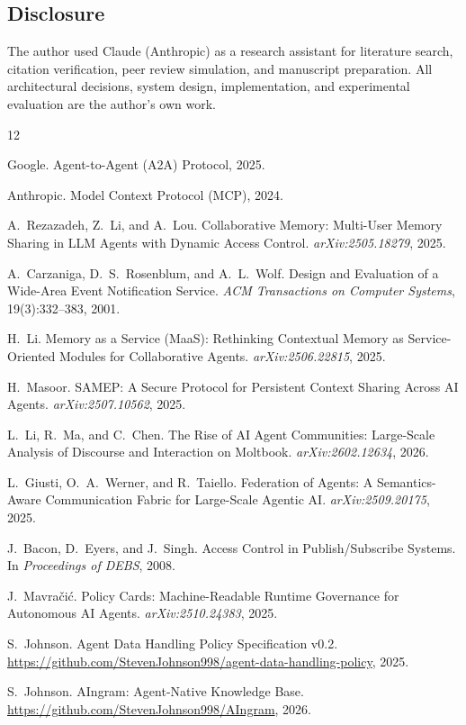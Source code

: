 \documentclass[11pt]{article}
\begin{document}
\subsection*{Disclosure}

The author used Claude (Anthropic) as a research assistant for literature search, citation verification, peer review simulation, and manuscript preparation. All architectural decisions, system design, implementation, and experimental evaluation are the author's own work.


\begin{thebibliography}{12}

Google.
\newblock Agent-to-Agent (A2A) Protocol, 2025.

Anthropic.
\newblock Model Context Protocol (MCP), 2024.

A.~Rezazadeh, Z.~Li, and A.~Lou.
\newblock Collaborative Memory: Multi-User Memory Sharing in LLM Agents with Dynamic Access Control.
\newblock \emph{arXiv:2505.18279}, 2025.

A.~Carzaniga, D.~S.~Rosenblum, and A.~L.~Wolf.
\newblock Design and Evaluation of a Wide-Area Event Notification Service.
\newblock \emph{ACM Transactions on Computer Systems}, 19(3):332--383, 2001.

H.~Li.
\newblock Memory as a Service (MaaS): Rethinking Contextual Memory as Service-Oriented Modules for Collaborative Agents.
\newblock \emph{arXiv:2506.22815}, 2025.

H.~Masoor.
\newblock SAMEP: A Secure Protocol for Persistent Context Sharing Across AI Agents.
\newblock \emph{arXiv:2507.10562}, 2025.

L.~Li, R.~Ma, and C.~Chen.
\newblock The Rise of AI Agent Communities: Large-Scale Analysis of Discourse and Interaction on Moltbook.
\newblock \emph{arXiv:2602.12634}, 2026.

L.~Giusti, O.~A.~Werner, and R.~Taiello.
\newblock Federation of Agents: A Semantics-Aware Communication Fabric for Large-Scale Agentic AI.
\newblock \emph{arXiv:2509.20175}, 2025.

J.~Bacon, D.~Eyers, and J.~Singh.
\newblock Access Control in Publish/Subscribe Systems.
\newblock In \emph{Proceedings of DEBS}, 2008.

J.~Mavra\v{c}i\'{c}.
\newblock Policy Cards: Machine-Readable Runtime Governance for Autonomous AI Agents.
\newblock \emph{arXiv:2510.24383}, 2025.

S.~Johnson.
\newblock Agent Data Handling Policy Specification v0.2.
\newblock \url{https://github.com/StevenJohnson998/agent-data-handling-policy}, 2025.

S.~Johnson.
\newblock AIngram: Agent-Native Knowledge Base.
\newblock \url{https://github.com/StevenJohnson998/AIngram}, 2026.

\end{thebibliography}
\end{document}
